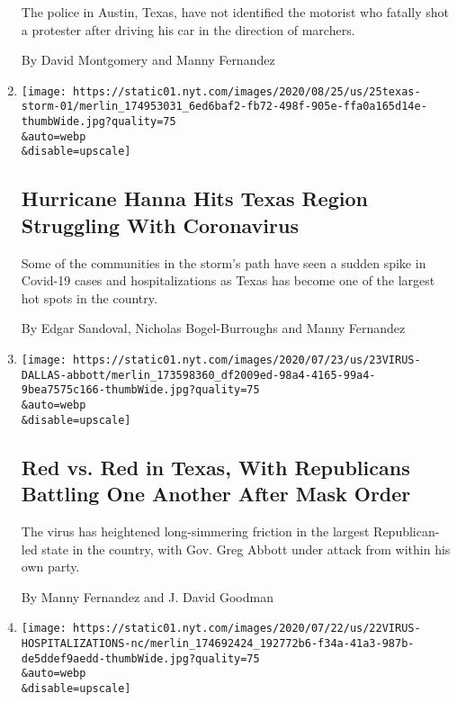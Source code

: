 \begin{enumerate}
  The police in Austin, Texas, have not identified the motorist who
  fatally shot a protester after driving his car in the direction of
  marchers.

  By David Montgomery and Manny Fernandez
\item
  \href{/2020/07/25/us/hanna-storm-texas.html}{}

  \texttt{[image: https://static01.nyt.com/images/2020/08/25/us/25texas-storm-01/merlin\_174953031\_6ed6baf2-fb72-498f-905e-ffa0a165d14e-thumbWide.jpg?quality=75\\\&auto=webp\\\&disable=upscale]}

  \hypertarget{hurricane-hanna-hits-texas-region-struggling-with-coronavirus}{%
  \subsection{Hurricane Hanna Hits Texas Region Struggling With
  Coronavirus}\label{hurricane-hanna-hits-texas-region-struggling-with-coronavirus}}

  Some of the communities in the storm's path have seen a sudden spike
  in Covid-19 cases and hospitalizations as Texas has become one of the
  largest hot spots in the country.

  By Edgar Sandoval, Nicholas Bogel-Burroughs and Manny Fernandez
\item
  \href{/2020/07/23/us/coronavirus-texas-abbott-republicans.html}{}

  \texttt{[image: https://static01.nyt.com/images/2020/07/23/us/23VIRUS-DALLAS-abbott/merlin\_173598360\_df2009ed-98a4-4165-99a4-9bea7575c166-thumbWide.jpg?quality=75\\\&auto=webp\\\&disable=upscale]}

  \hypertarget{red-vs-red-in-texas-with-republicans-battling-one-another-after-mask-order}{%
  \subsection{Red vs. Red in Texas, With Republicans Battling One
  Another After Mask
  Order}\label{red-vs-red-in-texas-with-republicans-battling-one-another-after-mask-order}}

  The virus has heightened long-simmering friction in the largest
  Republican-led state in the country, with Gov. Greg Abbott under
  attack from within his own party.

  By Manny Fernandez and J. David Goodman
\item
  \href{/2020/07/22/us/coronavirus-hospitalizations-near-peak.html}{}

  \texttt{[image: https://static01.nyt.com/images/2020/07/22/us/22VIRUS-HOSPITALIZATIONS-nc/merlin\_174692424\_192772b6-f34a-41a3-987b-de5ddef9aedd-thumbWide.jpg?quality=75\\\&auto=webp\\\&disable=upscale]}


\end{enumerate}
